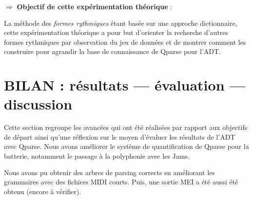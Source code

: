 $\Rightarrow$ \textbf{Objectif de cette expérimentation théorique} :

La méthode des \textit{formes rythmiques} étant basée sur une approche dictionnaire, cette expérimentation théorique a pour but d’orienter la recherche d’autres formes rythmiques par observation du jeu de données et de montrer comment les construire pour agrandir la base de connaissance de Qparse pour l’ADT.

\section{BILAN : résultats — évaluation — discussion}

Cette section regroupe les avancées qui ont été réalisées par rapport aux objectifs de départ ainsi qu’une réflexion sur le moyen d’évaluer les résultats de l’ADT avec Qparse. Nous avons améliorer le système de quantification de Qparse pour la batterie, notamment le passage à la polyphonie avec les Jams. 

Nous avons pu obtenir des arbres de parsing corrects en améliorant les grammaires avec des fichiers MIDI courts. 
Puis, une sortie MEI a été aussi été obtenu (encore à vérifier).



